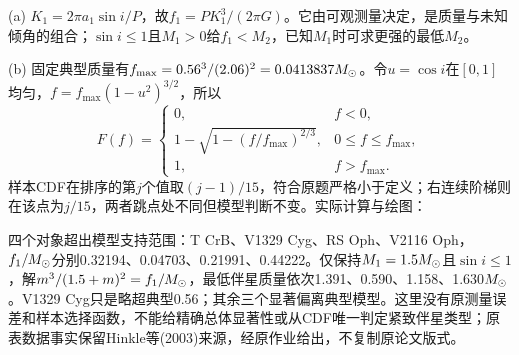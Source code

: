 \begin{solution}
(a) $K_1=2\pi a_1\sin i/P$，故$f_1=PK_1^3/(2\pi G)$。它由可观测量决定，是质量与未知倾角的组合；$\sin i\leq1$且$M_1>0$给$f_1<M_2$，已知$M_1$时可求更强的最低$M_2$。

(b) 固定典型质量有$f_{\max}=0.56^3/(2.06)^2=0.0413837M_{\odot}$。令$u=\cos i$在$[0,1]$均匀，$f=f_{\max}(1-u^2)^{3/2}$，所以
\[
 F(f)=\begin{cases}
 0,&f<0,\\
 1-\sqrt{1-(f/f_{\max})^{2/3}},&0\leq f\leq f_{\max},\\
 1,&f>f_{\max}.
 \end{cases}
\]
样本CDF在排序的第$j$个值取$(j-1)/15$，符合原题严格小于定义；右连续阶梯则在该点为$j/15$，两者跳点处不同但模型判断不变。实际计算与绘图：
\begin{center}\end{center}
四个对象超出模型支持范围：T CrB、V1329 Cyg、RS Oph、V2116 Oph，$f_1/M_{\odot}$分别0.32194、0.04703、0.21991、0.44222。仅保持$M_1=1.5M_{\odot}$且$\sin i\leq1$，解$m^3/(1.5+m)^2=f_1/M_{\odot}$，最低伴星质量依次1.391、0.590、1.158、1.630$M_{\odot}$。V1329 Cyg只是略超典型0.56；其余三个显著偏离典型模型。这里没有原测量误差和样本选择函数，不能给精确总体显著性或从CDF唯一判定紧致伴星类型；原表数据事实保留Hinkle等(2003)来源，经原作业给出，不复制原论文版式。
\end{solution}


